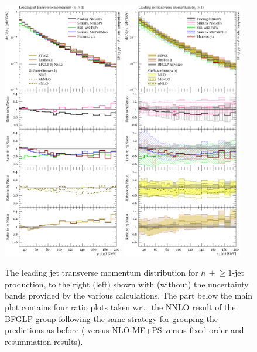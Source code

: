 \begin{figure}[t!]
  \centering
  \includegraphics[width=0.47\textwidth]{figures/hjetscomp_u_jet1_pT_incl.pdf}
  \hfill
  \includegraphics[width=0.47\textwidth]{figures/hjetscomp_jet1_pT_incl.pdf}
  \caption{\label{fig:hjetscomp:results:1obs:j1pt}%
    The leading jet transverse momentum distribution for
    $h\,+\!\ge\!1$-jet production, to the right (left) shown with
    (without) the uncertainty bands provided by the various
    calculations. The part below the main plot contains four ratio
    plots taken wrt.~the NNLO result of the BFGLP group following the
    same strategy for grouping the predictions as before (\NNLOPS
    versus NLO ME+PS versus fixed-order and resummation results).}
\end{figure}

